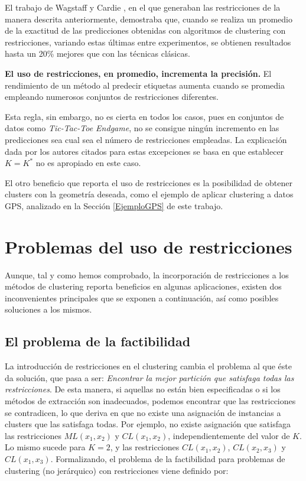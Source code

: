 El trabajo de Wagstaff y Cardie \cite{wagstaff2000clustering}, en el que generaban las restricciones de la manera descrita anteriormente, demostraba que, cuando se realiza un promedio de la exactitud de las predicciones obtenidas con algoritmos de clustering con restricciones, variando estas últimas entre experimentos, se obtienen resultados hasta un 20\% mejores que con las técnicas clásicas.

\begin{observacion}
	
	\textbf{El uso de restricciones, en promedio, incrementa la precisión.}
	El rendimiento de un método al predecir etiquetas aumenta cuando se promedia empleando numerosos conjuntos de restricciones diferentes. \cite{davidson2007survey}
	\label{ob:observacion33}
	
\end{observacion}

Esta regla, sin embargo, no es cierta en todos los casos, pues en conjuntos de datos como \textit{Tic-Tac-Toe Endgame}, no se consigue ningún incremento en las predicciones sea cual sea el número de restricciones empleadas. La explicación dada por los autores citados para estas excepciones se basa en que establecer $K = K^*$ no es apropiado en este caso.

El otro beneficio que reporta el uso de restricciones es la posibilidad de obtener clusters con la geometría deseada, como el ejemplo de aplicar clustering a datos \acs{GPS}, analizado en la Sección \ref{EjemploGPS} de este trabajo.

\section{Problemas del uso de restricciones} \label{Problemas}

Aunque, tal y como hemos comprobado, la incorporación de restricciones a los métodos de clustering reporta beneficios en algunas aplicaciones, existen dos inconvenientes principales que se exponen a continuación, así como posibles soluciones a los mismos.

\subsection{El problema de la factibilidad}

La introducción de restricciones en el clustering cambia el problema al que éste da solución, que pasa a ser: \textit{Encontrar la mejor partición que satisfaga todas las restricciones}. De esta manera, si aquellas no están bien especificadas o si los métodos de extracción son inadecuados, podemos encontrar que las restricciones se contradicen, lo que deriva en que no existe una asignación de instancias a clusters que las satisfaga todas. Por ejemplo, no existe asignación que satisfaga las restricciones $ML(x_1,x_2)$ y $CL(x_1,x_2)$, independientemente del valor de $K$. Lo mismo sucede para $K = 2$, y las restricciones $CL(x_1, x_2)$, $CL(x_2, x_3)$ y $CL(x_1, x_3)$. Formalizando, el problema de la factibilidad para problemas de clustering (no jerárquico) con restricciones viene definido por:

